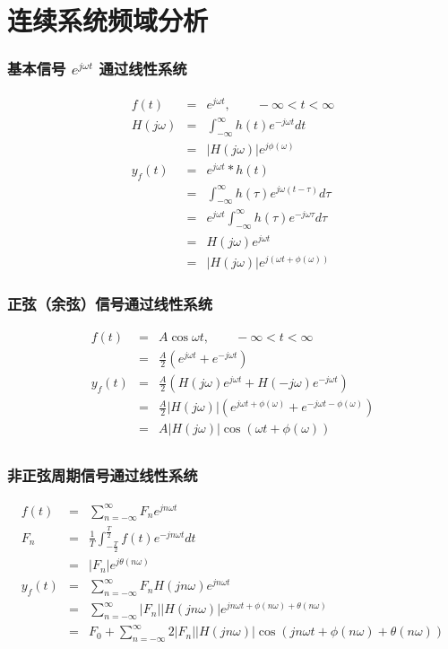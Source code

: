 \documentclass{beamer}
\begin{document}
\section{连续系统频域分析}
\label{sec-6}
\begin{frame}
\frametitle{基本信号 $e^{j\omega t}$ 通过线性系统}
\label{sec-6-1}

\begin{eqnarray*}
f(t) & =& e^{j\omega t},\qquad -\infty < t < \infty \\
H(j\omega) &=& \int_{-\infty}^{\infty}h(t)e^{-j\omega t}dt \\
           &=& |H(j\omega)|e^{j\phi(\omega)} \\
y_f(t) &=& e^{j\omega t}*h(t) \\
       &=& \int_{-\infty}^{\infty}h(\tau)e^{j\omega(t-\tau)}d\tau \\
       &=& e^{j\omega t}\int_{-\infty}^{\infty}h(\tau)e^{-j\omega\tau}d\tau \\
       &=& H(j\omega)e^{j\omega t} \\
       &=& |H(j\omega)|e^{j(\omega t+\phi(\omega))}
\end{eqnarray*}
\end{frame}
\begin{frame}
\frametitle{正弦（余弦）信号通过线性系统}
\label{sec-6-2}

\begin{eqnarray*}
f(t) & =& A\cos\omega t , \qquad  -\infty<t<\infty \\
     &=&\frac{A}{2}(e^{j\omega t}+e^{-j\omega t}) \\
y_f(t) &=& \frac{A}{2}(H(j\omega)e^{j\omega t}+H(-j\omega)e^{-j\omega t}) \\
       &=& \frac{A}{2}|H(j\omega)|(e^{j\omega t+\phi(\omega)}+e^{-j\omega t-\phi(\omega)}) \\
       &=& A|H(j\omega)|\cos(\omega t+\phi(\omega)) \\
\end{eqnarray*}
\end{frame}
\begin{frame}
\frametitle{非正弦周期信号通过线性系统}
\label{sec-6-3}

\begin{eqnarray*}
f(t) &=& \sum_{n=-\infty}^{\infty}F_n e^{jn\omega t} \\
F_n &=& \frac{1}{T}\int_{-\frac{T}{2}}^{\frac{T}{2}}f(t)e^{-jn\omega t}dt \\
    &=& |F_n|e^{j\theta(n\omega)} \\
y_f(t) &=& \sum_{n=-\infty}^{\infty}F_nH(jn\omega)e^{jn\omega t} \\
       &=& \sum_{n=-\infty}^{\infty}|F_n||H(jn\omega)|e^{jn\omega t+\phi(n\omega)+\theta(n\omega)} \\
       &=& F_0+ \sum_{n=-\infty}^{\infty}2|F_n||H(jn\omega)|\cos(jn\omega t+\phi(n\omega)+\theta(n\omega))
\end{eqnarray*}
\end{frame}
\end{document}
